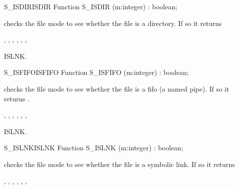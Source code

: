 \begin{functionl}{S\_ISDIR}{ISDIR}
\Declaration
Function S\_ISDIR (m:integer) : boolean;

\Description
  checks the file mode  to see whether the file is a
directory. If so it returns 

\Errors
{},
 , 
 ,
 ,
 ,
 ,

\SeeAlso
ISLNK.
\end{functionl}
\begin{functionl}{S\_ISFIFO}{ISFIFO}
\Declaration
Function S\_ISFIFO (m:integer) : boolean;

\Description
  checks the file mode  to see whether the file is a
fifo (a named pipe). If so it returns .

\Errors
{},
 , 
 ,
 ,
 ,
 ,

\SeeAlso
ISLNK.
\end{functionl}

\begin{functionl}{S\_ISLNK}{ISLNK}
\Declaration
Function S\_ISLNK (m:integer) : boolean;

\Description
  checks the file mode  to see whether the file is a
symbolic link. If so it returns 

\Errors
{},
 ,
 ,
 ,
 ,
 ,

\SeeAlso
\end{functionl}


